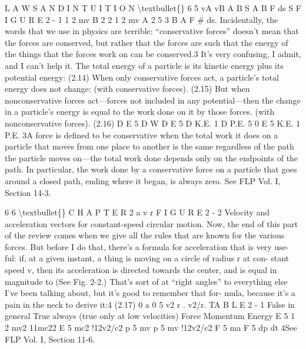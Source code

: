 \documentclass[10pt,oneside]{article}
\begin{document}
L A W S  A N D  I N T U I T I O N \textbackslash{}textbullet\{\} 6 5 vA vB A B S A B F ds S F I G U R E  2 - 1 1 2  mv B 2 2 1 2  mv A 2 5 3 B A F \# ds. Incidentally, the words that we use in physics are terrible: “conservative forces” doesn’t mean that the forces are conserved, but rather that the forces are such that the energy of the things that the forces work on can be conserved.3 It’s very confusing, I admit, and I can’t help it. The total energy of a particle is its kinetic energy plus its potential energy: (2.14) When only conservative forces act, a particle’s total energy does not change: (with conservative forces). (2.15) But when nonconservative forces act---forces not included in any potential---then the change in a particle’s energy is equal to the work done on it by those forces. (with nonconservative forces). (2.16) D E 5 D W D E 5 D K.E. 1 D P.E. 5 0 E 5 K.E. 1 P.E. 3A force is defined to be conservative when the total work it does on a particle that moves from one place to another is the same regardless of the path the particle moves on---the total work done depends only on the endpoints of the path. In particular, the work done by a conservative force on a particle that goes around a closed path, ending where it began, is always zero. See FLP Vol. I, Section 14-3.\par

6 6 \textbackslash{}textbullet\{\} C H A P T E R  2 a v r F I G U R E 2 - 2 Velocity and acceleration vectors for constant-speed circular motion. Now, the end of this part of the review comes when we give all the rules that are known for the various forces. But before I do that, there’s a formula for acceleration that is very use- ful: if, at a given instant, a thing is moving on a circle of radius r at con- stant speed v, then its acceleration is directed towards the center, and is equal in magnitude to (See Fig. 2-2.) That’s sort of at “right angles” to everything else I’ve been talking about, but it’s good to remember that for- mula, because it’s a pain in the neck to derive it:4 (2.17) 0 a 0 5 v2 r . v2/r. TA B L E 2 - 1 False in general True always (true only at low velocities) Force Momentum Energy E 5  1 2 mv2 11mc22 E 5 mc2 !12v2/c2 p 5 mv p 5 mv !12v2/c2 F 5 ma F 5 dp dt 4See FLP Vol. I, Section 11-6.\par
\end{document}
